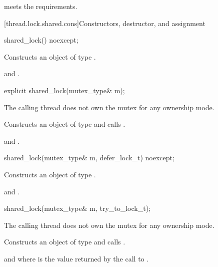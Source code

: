 \pnum
\begin{note}  meets the 
requirements. \end{note}

[thread.lock.shared.cons]{Constructors, destructor, and assignment}

%
\begin{itemdecl}
shared_lock() noexcept;
\end{itemdecl}

\begin{itemdescr}
\pnum
\effects Constructs an object of type .

\pnum
\ensures {} and .
\end{itemdescr}

%
\begin{itemdecl}
explicit shared_lock(mutex_type& m);
\end{itemdecl}

\begin{itemdescr}
\pnum
\requires The calling thread does not own the mutex for any ownership mode.

\pnum
\effects Constructs an object of type  and calls .

\pnum
\ensures {} and .
\end{itemdescr}

%
\begin{itemdecl}
shared_lock(mutex_type& m, defer_lock_t) noexcept;
\end{itemdecl}

\begin{itemdescr}
\pnum
\effects Constructs an object of type .

\pnum
\ensures {} and .
\end{itemdescr}

%
\begin{itemdecl}
shared_lock(mutex_type& m, try_to_lock_t);
\end{itemdecl}

\begin{itemdescr}
\pnum
\requires The calling thread does not own the mutex for any ownership mode.

\pnum
\effects Constructs an object of type  and calls .

\pnum
\ensures {} and 
where  is the
value returned by the call to .
\end{itemdescr}

